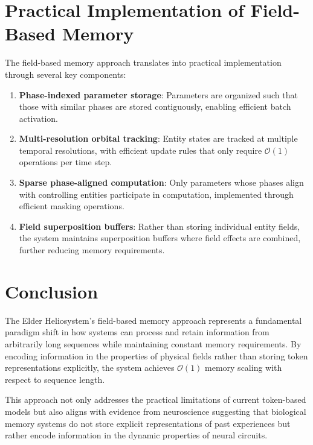 \section{Practical Implementation of Field-Based Memory}

The field-based memory approach translates into practical implementation through several key components:

\begin{enumerate}
    \item \textbf{Phase-indexed parameter storage}: Parameters are organized such that those with similar phases are stored contiguously, enabling efficient batch activation.
    
    \item \textbf{Multi-resolution orbital tracking}: Entity states are tracked at multiple temporal resolutions, with efficient update rules that only require $\mathcal{O}(1)$ operations per time step.
    
    \item \textbf{Sparse phase-aligned computation}: Only parameters whose phases align with controlling entities participate in computation, implemented through efficient masking operations.
    
    \item \textbf{Field superposition buffers}: Rather than storing individual entity fields, the system maintains superposition buffers where field effects are combined, further reducing memory requirements.
\end{enumerate}

\section{Conclusion}

The Elder Heliosystem's field-based memory approach represents a fundamental paradigm shift in how systems can process and retain information from arbitrarily long sequences while maintaining constant memory requirements. By encoding information in the properties of physical fields rather than storing token representations explicitly, the system achieves $\mathcal{O}(1)$ memory scaling with respect to sequence length.

This approach not only addresses the practical limitations of current token-based models but also aligns with evidence from neuroscience suggesting that biological memory systems do not store explicit representations of past experiences but rather encode information in the dynamic properties of neural circuits.